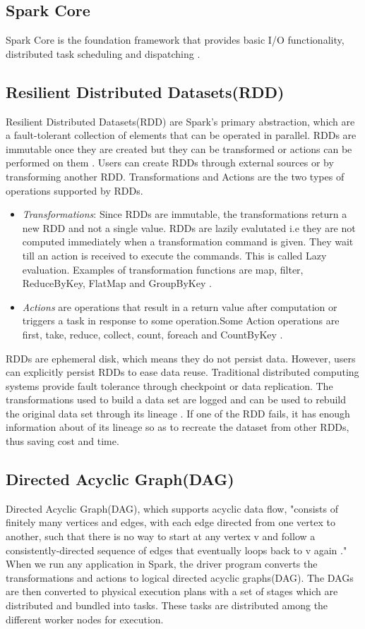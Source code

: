 \documentclass[9pt,twocolumn,twoside]{../../styles/osajnl}
\begin{document}
\subsection{Spark Core}

Spark Core is the foundation framework that provides basic I/O
functionality, distributed task scheduling and dispatching
\cite{article-spark-1}.
\subsection{Resilient Distributed Datasets(RDD)}
Resilient Distributed Datasets(RDD) \cite{paper-RDD} are Spark's
primary abstraction, which are a fault-tolerant collection of elements
that can be operated in parallel. RDDs are immutable once they are
created but they can be transformed or actions can be performed on
them \cite{article-spark-1}. Users can create RDDs through external
sources or by transforming another RDD. Transformations and Actions
are the two types of operations supported by RDDs.
\begin{itemize}
\item \textit{Transformations}: Since RDDs are immutable, the
  transformations return a new RDD and not a single value. RDDs are
  lazily evalutated i.e they are not computed immediately when a
  transformation command is given. They wait till an action is
  received to execute the commands. This is called Lazy
  evaluation. Examples of transformation functions are map, filter,
  ReduceByKey, FlatMap and GroupByKey \cite{article-spark-1}.
\item \textit{Actions} are operations that result in a return value
  after computation or triggers a task in response to some
  operation.Some Action operations are first, take, reduce, collect,
  count, foreach and CountByKey \cite{article-spark-1}.
\end{itemize}
RDDs are ephemeral disk, which means they do not persist
data. However, users can explicitly persist RDDs to ease data
reuse. Traditional distributed computing systems provide fault
tolerance through checkpoint or data replication. The transformations
used to build a data set are logged and can be used to rebuild the
original data set through its lineage \cite{paper-RDD}. If one of the
RDD fails, it has enough information about of its lineage so as to
recreate the dataset from other RDDs, thus saving cost and time.
\subsection{Directed Acyclic Graph(DAG)}
Directed Acyclic Graph(DAG), which supports acyclic data flow,
"consists of finitely many vertices and edges, with each edge directed
from one vertex to another, such that there is no way to start at any
vertex v and follow a consistently-directed sequence of edges that
eventually loops back to v again \cite{wiki-DAG}." When we run any
application in Spark, the driver program converts the transformations
and actions to logical directed acyclic graphs(DAG). The DAGs are then
converted to physical execution plans with a set of stages which are
distributed and bundled into tasks. These tasks are distributed among
the different worker nodes for execution.
\end{document}
